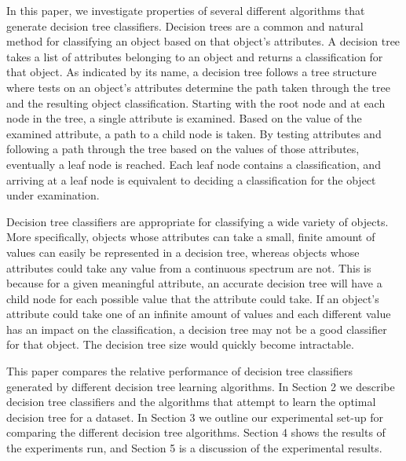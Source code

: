 \documentclass[12pt, letterpaper]{article}
\begin{document}
In this paper, we investigate properties of several different algorithms that generate
decision tree classifiers.  Decision trees are a common and natural method for classifying an object
based on that object's attributes\cite{Russell}.  A decision tree takes a list of 
attributes belonging to an object and returns a classification for that object\cite{Russell}. 
As indicated by its name, a decision tree follows a tree structure where tests on an object's attributes
determine the path taken through the tree and the resulting object classification.
Starting with the root node and at each node in the tree, a single attribute is examined.  
Based on the value of the examined attribute,
a path to a child node is taken.  By testing attributes and following a path
through the tree based on the values of those attributes, eventually a leaf
node is reached.  Each leaf node contains a classification, and arriving at a
leaf node is equivalent to deciding a classification for the object under
examination.

Decision tree classifiers are appropriate for classifying a wide variety of objects.  More
specifically, objects whose attributes can take a small, finite amount of values can easily
be represented in a decision tree, whereas objects whose attributes could take any value from
a continuous spectrum are not.  This is because for a given meaningful attribute, an accurate decision tree
will have a child node for each possible value that the attribute could take.  If an object's attribute could take one
of an infinite amount of values and each different value has an impact on the classification,
a decision tree may not be a good classifier for that object.  The decision tree size would quickly become intractable.


This paper compares the relative performance of decision tree classifiers generated by 
different decision tree learning algorithms. In Section 2 we describe decision tree classifiers and the
algorithms that attempt to learn the optimal decision tree for a dataset.  In Section 3 we outline our experimental
set-up for comparing the different decision tree algorithms. Section 4 shows the results of
the experiments run, and Section 5 is a discussion of the experimental results.   
\end{document}
